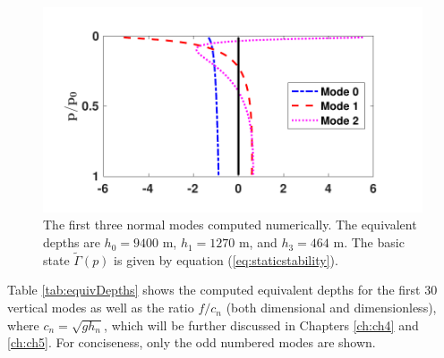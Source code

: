 \begin{figure}[H]
\includegraphics[scale=1]{./Chapter2/img/normalmodes}
\caption{The first three normal modes computed numerically. The equivalent depths are $h_0 = 9400$ m, $h_1 = 1270$ m, and $h_3 = 464$ m. The basic state $\tilde{\Gamma}(p)$ is given by equation (\ref{eq:staticstability}).}
\label{fig:normalmodes}
\end{figure}

Table \ref{tab:equivDepths} shows the computed equivalent depths for the first 30 vertical modes as well as the ratio $f/c_n$ (both dimensional and dimensionless), where $c_n = \sqrt{gh_n}$, which will be further discussed in Chapters \ref{ch:ch4} and \ref{ch:ch5}. For conciseness, only the odd numbered modes are shown. \\

